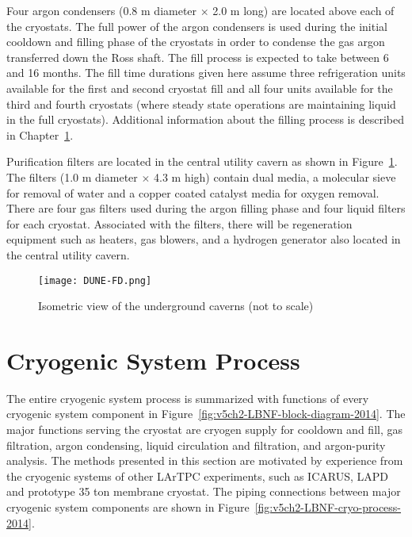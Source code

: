 Four argon condensers (0.8 m diameter $\times$ 2.0 m long) 
are located above each of the cryostats. The full 
power of the argon condensers is used during the initial 
cooldown and filling phase of the cryostats in order to
condense the gas argon transferred down the Ross 
shaft. The fill process is expected to take between 6 and 16 months. 
The fill time durations given here assume three refrigeration 
units available for the first and second cryostat fill and
all four units available for the third and fourth cryostats (where
steady state operations are maintaining liquid in the full cryostats).
Additional information about the filling process is 
described in Chapter~\ref{sec:cryo-cryosys-proc}.  



Purification filters are located in the central utility cavern 
as shown in Figure~\ref{fig:det-cavern-purif}. The filters (1.0 m
diameter $\times$ 4.3 m high) contain dual media, a molecular 
sieve for removal of water and a copper coated catalyst media 
for oxygen removal. There are four gas filters used during 
the argon filling phase and four liquid filters for each cryostat. 
Associated with the filters, there will be regeneration 
equipment such as heaters, gas blowers, and a hydrogen
generator also located in the central utility cavern.

\begin{figure}[htbp]
\centering
\texttt{[image: DUNE-FD.png]} 
\caption{Isometric view of the underground caverns (not to scale)}
\label{fig:det-cavern-purif}
\end{figure}


\chapter{Cryogenic System Process}
\label{sec:cryo-cryosys-proc}
The entire cryogenic system process is summarized with functions of 
every cryogenic system component in 
Figure~\ref{fig:v5ch2-LBNF-block-diagram-2014}.  
The major functions serving the cryostat are cryogen supply for 
cooldown and fill, gas filtration, argon condensing, liquid 
circulation and filtration, and argon-purity analysis. 
The methods presented in this section are motivated by
experience from the cryogenic systems of other LArTPC 
experiments, such as ICARUS, LAPD and prototype 35 ton 
membrane cryostat. The piping
connections between major cryogenic system components 
are shown in Figure~\ref{fig:v5ch2-LBNF-cryo-process-2014}.

